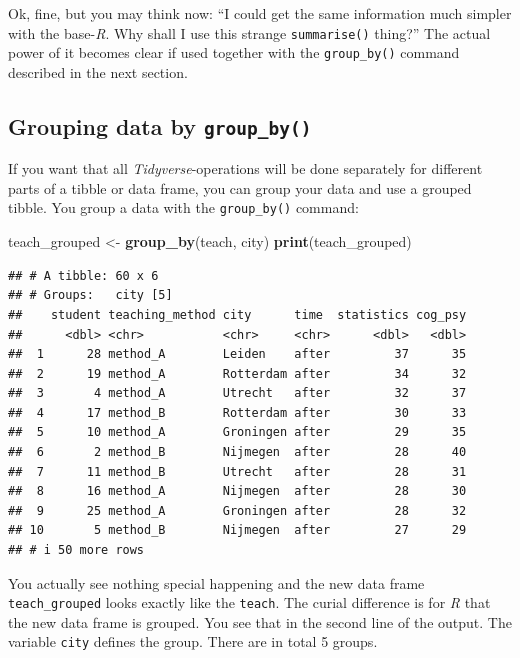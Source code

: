 \documentclass[
]{scrartcl}
\newenvironment{Shaded}{\begin{snugshade}}{\end{snugshade}}
\newcommand{\KeywordTok}[1]{\textcolor[rgb]{0.13,0.29,0.53}{\textbf{#1}}}
\newcommand{\NormalTok}[1]{#1}
\newcommand{\StringTok}[1]{\textcolor[rgb]{0.31,0.60,0.02}{#1}}
\begin{document}
Ok, fine, but you may think now: ``I could get the same information much simpler with the base-\emph{R}. Why shall I use this strange \texttt{summarise()} thing?'' The actual power of it becomes clear if used together with the \texttt{group\_by()} command described in the next section.

\hypertarget{grouping-data-by-group_by}{%
\subsection{\texorpdfstring{Grouping data by \texttt{group\_by()}}{Grouping data by group\_by()}}\label{grouping-data-by-group_by}}

If you want that all \emph{Tidyverse}-operations will be done separately for different parts of a tibble or data frame, you can group your data and use a grouped tibble. You group a data with the \texttt{group\_by()} command:

\begin{Shaded}
\begin{Highlighting}[]
\NormalTok{teach\_grouped \textless{}{-}}\StringTok{ }\KeywordTok{group\_by}\NormalTok{(teach, city)}
\KeywordTok{print}\NormalTok{(teach\_grouped)}
\end{Highlighting}
\end{Shaded}

\begin{verbatim}
## # A tibble: 60 x 6
## # Groups:   city [5]
##    student teaching_method city      time  statistics cog_psy
##      <dbl> <chr>           <chr>     <chr>      <dbl>   <dbl>
##  1      28 method_A        Leiden    after         37      35
##  2      19 method_A        Rotterdam after         34      32
##  3       4 method_A        Utrecht   after         32      37
##  4      17 method_B        Rotterdam after         30      33
##  5      10 method_A        Groningen after         29      35
##  6       2 method_B        Nijmegen  after         28      40
##  7      11 method_B        Utrecht   after         28      31
##  8      16 method_A        Nijmegen  after         28      30
##  9      25 method_A        Groningen after         28      32
## 10       5 method_B        Nijmegen  after         27      29
## # i 50 more rows
\end{verbatim}

You actually see nothing special happening and the new data frame \texttt{teach\_grouped} looks exactly like the \texttt{teach}. The curial difference is for \emph{R} that the new data frame is grouped. You see that in the second line of the output. The variable \texttt{city} defines the group. There are in total 5 groups.
\end{document}
